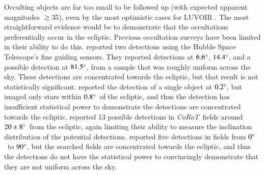 \documentclass[printer]{aa}
\begin{document}
{Occulting objects are far too small to be followed up (with expected apparent magnitudes $\gtrsim 35$), even by the most optimistic cases for LUVOIR \citep{2019arXiv191206219T}.  The most straightforward evidence would be to demonstrate that the occultations preferentially occur in the ecliptic.  Previous occultation surveys have been limited in their ability to do this.  \citet{2012ApJ...761..150S} reported two detections using the Hubble Space Telescope's fine guiding sensors.  They reported detections at $6.6\degree$, $14.4 \degree$, and a possible detection at $81.5 \degree$, from a sample that was roughly uniform across the sky.  These detections are concentrated towards the ecliptic, but that result is not statistically significant.  \citet{2019NatAs...3..301A} reported the detection of a single object at $0.2 \degree$, but imaged only stars within $0.8 \degree$~of the ecliptic, and thus the detection has insufficient statistical power to demonstrate the detections are concentrated towards the ecliptic.  \citet{2015MNRAS.446..932L} reported 13 possible detections in \textit{CoRoT}~fields around $20 \pm 8 \degree$~from the ecliptic, again limiting their ability to measure the inclination distribution of the potential detections.  \citet{2020submitted} reported five detections in fields from $0 \degree$~to $90 \degree$, but the searched fields are concentrated towards the ecliptic, and thus the detections do not have the statistical power to convincingly demonstrate that they are not uniform across the sky.

}
\end{document}
